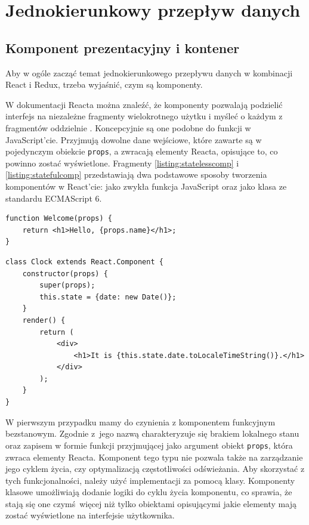 \section{Jednokierunkowy przepływ danych}
\subsection{Komponent prezentacyjny i kontener}
Aby w ogóle zacząć temat jednokierunkowego przepływu danych w kombinacji React i Redux, trzeba wyjaśnić, czym są komponenty.

W dokumentacji Reacta można znaleźć, że komponenty pozwalają podzielić interfejs na niezależne fragmenty wielokrotnego użytku i myśleć o każdym z fragmentów oddzielnie \cite{reactDocs}. Koncepcyjnie są one podobne do funkcji w JavaScript'cie. Przyjmują dowolne dane wejściowe, które zawarte są w pojedynczym obiekcie \lstinline{props}, a zwracają elementy Reacta, opisujące to, co powinno zostać wyświetlone. Fragmenty \ref{listing:statelesscomp} i \ref{listing:statefulcomp} przedstawiają dwa podstawowe sposoby tworzenia komponentów w React'cie: jako zwykła funkcja JavaScript oraz jako klasa ze standardu ECMAScript 6.

\begin{lstlisting}[style=JavaScript, caption=Funkcyjny komponent bezstanowy, label=listing:statelesscomp]
function Welcome(props) {
	return <h1>Hello, {props.name}</h1>;
}
\end{lstlisting}

\begin{lstlisting}[style=JavaScript, caption=Komponent stanowy jako klasa ECMAScript 6, label=listing:statefulcomp]
class Clock extends React.Component {
	constructor(props) {
		super(props);
		this.state = {date: new Date()};
	}
	render() {
		return (
			<div>
				<h1>It is {this.state.date.toLocaleTimeString()}.</h1>
			</div>
		);
	}
}
\end{lstlisting}
W pierwszym przypadku mamy do czynienia z komponentem funkcyjnym bezstanowym. Zgodnie z~jego nazwą charakteryzuje się brakiem lokalnego stanu oraz zapisem w formie funkcji przyjmującej jako argument obiekt \lstinline{props}, która zwraca elementy Reacta. Komponent tego typu nie pozwala także na zarządzanie jego cyklem życia, czy optymalizacją częstotliwości odświeżania. Aby skorzystać z tych funkcjonalności, należy użyć implementacji za pomocą klasy. Komponenty klasowe umożliwiają dodanie logiki do cyklu życia komponentu, co sprawia, że stają się one czymś więcej niż tylko obiektami opisującymi jakie elementy mają zostać wyświetlone na interfejsie użytkownika.

